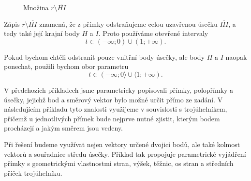 \begin{figure}[H]
    \centering
    \caption{Množina $r\setminus\overline{HI}$}
    \label{fig:Parametric_line_without_segment_HI}
\end{figure}

\begin{remark}\label{rem:Removing_segment_or_its_interior}
    Zápis $r\setminus\overline{HI}$ znamená, že z přímky odstraňujeme
    celou uzavřenou úsečku $\overline{HI}$, a tedy také její krajní
    body $H$ a $I$. Proto používáme otevřené intervaly
    \[
        t\in(-\infty;0)\cup(1;+\infty).
    \]

    Pokud bychom chtěli odstranit pouze vnitřní body úsečky, ale body
    $H$ a $I$ naopak ponechat, použili bychom obor parametru
    \[
        t\in(-\infty;0\rangle\cup\langle1;+\infty).
    \]
\end{remark}

V předchozích příkladech jsme parametricky popisovali přímky, polopřímky
a úsečky, jejichž bod a směrový vektor bylo možné určit přímo ze zadání.
V následujícím příkladu tyto znalosti využijeme v souvislosti s trojúhelníkem,
přičemž u jednotlivých přímek bude nejprve nutné zjistit, kterým bodem
procházejí a jakým směrem jsou vedeny.

Při řešení budeme využívat nejen vektory určené dvojicí bodů, ale také
kolmost vektorů a souřadnice středu úsečky. Příklad tak propojuje
parametrické vyjádření přímky s geometrickými vlastnostmi stran, výšek,
těžnic, os stran a středních příček trojúhelníku.

